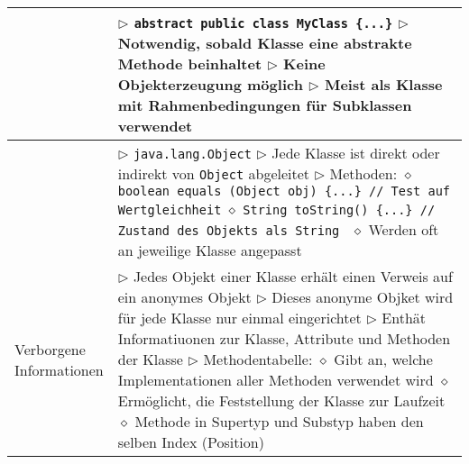 \begin{longtable}{ | p{} p{} | }
	\makecell[l]{Abstraktion} & \makecell[l]{
	$\triangleright$ \texttt{abstract public class MyClass \{...\}} \\
	$\triangleright$ Notwendig, sobald Klasse eine abstrakte Methode beinhaltet \\
	$\triangleright$ Keine Objekterzeugung möglich \\
	$\triangleright$ Meist als Klasse mit Rahmenbedingungen für Subklassen verwendet }  \\ \hline
	
	\makecell[l]{Klasse aller Klassen} & \makecell[l]{
	$\triangleright$ \texttt{java.lang.Object} \\
	$\triangleright$ Jede Klasse ist direkt oder indirekt von \texttt{Object} abgeleitet \\
	$\triangleright$ Methoden: \\
	\hspace{0.4cm} $\diamond$ \texttt{boolean equals (Object obj) \{...\} // Test auf Wertgleichheit} \\
	\hspace{0.4cm} $\diamond$ \texttt{String toString() \{...\} // Zustand des Objekts als String } \\
	\hspace{0.4cm} $\diamond$ Werden oft an jeweilige Klasse angepasst } \\ \hline
	
	\makecell[l]{Verborgene \\ Informationen} & \makecell[l]{
	$\triangleright$ Jedes Objekt einer Klasse erhält einen Verweis auf ein anonymes Objekt \\
	$\triangleright$ Dieses anonyme Objket wird für jede Klasse nur einmal eingerichtet \\
	$\triangleright$ Enthät Informatiuonen zur Klasse, Attribute und Methoden der Klasse \\
	$\triangleright$ Methodentabelle: \\
	\hspace{0.4cm} $\diamond$ Gibt an, welche Implementationen aller Methoden verwendet wird \\
	\hspace{0.4cm} $\diamond$ Ermöglicht, die Feststellung der Klasse zur Laufzeit \\
	\hspace{0.4cm} $\diamond$ Methode in Supertyp und Substyp haben den selben Index (Position) } \\ \hline


\end{longtable}
